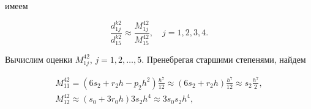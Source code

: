 имеем

\begin{equation}

\label{mvc:eq62}

   \frac{d_{1j}^{k2}}{d_{15}^{k2}}\approx\frac{M_{1j}^{42}}{M_{15}^{42}},\quad 

j=1,  2,  3,  4.

\end{equation}



Вычислим оценки $M_{1j}^{42}$, $j=1,  2,  \dots,  5$. Пренебрегая старшими степенями, найдем

\begin{gather}

\label{mvc:eq63}

M_{11}^{42}=











   (6s_2+r_2h-p_2h^2)\frac{h^7}{12}\approx  (6s_2+r_2h)\frac{h^7}{12}

 \approx  s_2\frac{h^7}{2},



\\

\label{mvc:eq67}  

M_{12}^{42}\approx

  (s_0+3r_0h)3s_2h^4\approx  3s_0s_2h^4,




\end{gather}
